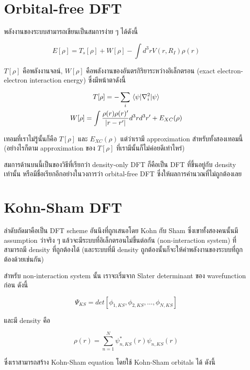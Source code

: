 \section{Orbital-free DFT}

พลังงานของระบบสามารถเขียนเป็นสมการง่าย ๆ ได้ดังนี้

\begin{equation}
    E[\rho] = T_{s}[\rho] + W[\rho] - \int d^{3} r V(r,R_{I}) \rho(r)
\end{equation}

\noindent $T[\rho]$ คือพลังงานจลน์, $W[\rho]$ คือพลังงานของอันตรกิริยาระหว่างอิเล็กตรอน
(exact electron-electron interaction energy) ซึ่งมีหน้าตาดังนี้

\begin{gather}
    T[\rho] = -\sum_{i} \mel{\psi}{\nabla^{2}_{i}}{\psi} \\
    W[\rho] = \int \frac{\rho(r)\rho(r)'}{|r-r'|} d^{3} r d^{3} r' + E_{XC}(\rho)
\end{gather}

เทอมที่เราไม่รู้นั้นก็คือ $T[\rho]$ และ  $E_{XC}(\rho)$ แต่ว่าเรามี approximation สำหรับทั้งสองเทอมนี้
(อย่างไรก็ตาม approximation ของ $T[\rho]$ ที่เรามีนั้นก็ไม่ค่อยดีเท่าไหร่)

สมการด้านบนนี้เป็นของวิธีที่เรียกว่า density-only DFT ก็คือเป็น DFT ที่ขึ้นอยู่กับ density เท่านั้น
หรือมีชื่อเรียกอีกอย่างในวงการว่า orbital-free DFT ซึ่งให้ผลการคำนวณที่ไม่ถูกต้องเลย

\section{Kohn-Sham DFT}

ลำดับถัดมาคือเป็น DFT scheme อันนึงที่ถูกเสนอโดย Kohn กับ Sham ซึ่งเขาทั้งสองคนนั้นมี assumption
ว่าจริง ๆ แล้วจะมีระบบที่อิเล็กตรอนไม่ขึ้นต่อกัน (non-interaction system) ที่สามารถมี density
ที่ถูกต้องได้ (และระบบที่มี density ถูกต้องนั้นก็จะให้ค่าพลังงานของระบบที่ถูกต้องด้วยเช่นกัน)

สำหรับ non-interaction system นั้น เราจะเริ่มจาก Slater determinant ของ wavefunction
ก่อน ดังนี้

\begin{equation}
    \Psi_{KS} = det[\phi_{1,KS}, \phi_{2,KS}, \dots, \phi_{N,KS}]
\end{equation}

\noindent และมี density คือ

\begin{equation}
    \rho(r) = \sum^{N}_{n=1} \psi_{n,KS}^{\ast}(r) \psi_{n,KS}(r)
\end{equation}

\noindent ซึ่งเราสามารถสร้าง Kohn-Sham equation โดยใช้ Kohn-Sham orbitals ได้ ดังนี้ 

